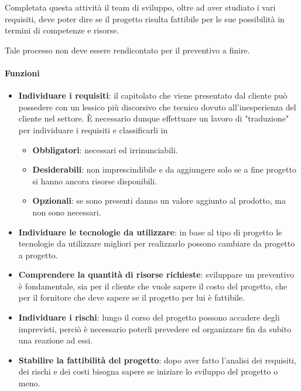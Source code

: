 	Completata questa attività il team di sviluppo, oltre ad aver studiato i vari requisiti, deve poter dire se il progetto risulta fattibile per le sue possibilità in termini di competenze e risorse.
	
	Tale processo non deve essere rendicontato per il preventivo a finire.
	
		\paragraph*{Funzioni}
		
		\begin{itemize}
			\item \textbf{Individuare i requisiti}: il capitolato che viene presentato dal cliente può possedere con un lessico più discorsivo che tecnico dovuto all'inesperienza del cliente nel settore.
				\`E necessario dunque effettuare un lavoro di "traduzione" per individuare i requisiti e classificarli in

			\begin{itemize}
				\item \textbf{Obbligatori}: necessari ed irrinunciabili.
				\item \textbf{Desiderabili}: non imprescindibile e da aggiungere solo se a fine progetto si hanno ancora risorse disponibili.
				\item \textbf{Opzionali}: se sono presenti danno un valore aggiunto al prodotto, ma non sono necessari.
			\end{itemize}
			\item \textbf{Individuare le tecnologie da utilizzare}: in base al tipo di progetto le tecnologie da utilizzare migliori per realizzarlo possono cambiare da progetto a progetto.
			\item \textbf{Comprendere la quantità di risorse richieste}: sviluppare un preventivo è fondamentale, sia per il cliente che vuole sapere il costo del progetto, che per il fornitore che deve sapere se il progetto per lui è fattibile.
			\item \textbf{Individuare i rischi}: lungo il corso del progetto possono accadere degli imprevisti, perciò è necessario poterli prevedere ed organizzare fin da subito una reazione ad essi.
			\item \textbf{Stabilire la fattibilità del progetto}: dopo aver fatto l'analisi dei requisiti, dei rischi e dei costi bisogna sapere se iniziare lo sviluppo del progetto o meno.
		\end{itemize}

